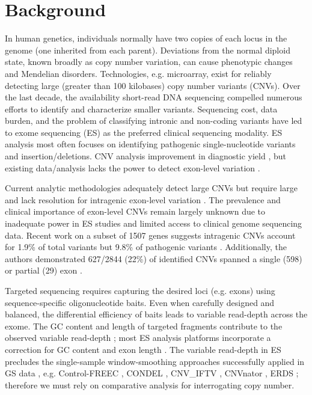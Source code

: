 \documentclass{bmcart}\usepackage[]{graphicx}\usepackage[]{color}
\begin{document}
\section{Background}

In human genetics, individuals normally have two copies of each locus in the genome (one inherited from each parent).
Deviations from the normal diploid state, known broadly as copy number variation, can cause phenotypic changes and Mendelian disorders.
Technologies, e.g. microarray, exist for reliably detecting large (greater than 100 kilobases) copy number variants (CNVs).
Over the last decade, the availability short-read DNA sequencing compelled numerous efforts to identify and characterize smaller variants.
Sequencing cost, data burden, and the problem of classifying intronic and non-coding variants have led to exome sequencing (ES) as the preferred clinical sequencing modality.
ES analysis most often focuses on identifying pathogenic single-nucleotide variants and insertion/deletions.
CNV analysis  improvement in diagnostic yield \cite{marchuk:2018aa}, but existing data/analysis lacks the power to detect exon-level variation \cite{retterer:2015aa,yao:2017aa}.

Current analytic methodologies adequately detect large CNVs but require large  and lack resolution for intragenic exon-level variation \cite{plagnol:2012aa,krumm:2012aa,fromer:2012aa,jiang:2015aa}.
The prevalence and clinical importance of exon-level CNVs remain largely unknown due to inadequate power in ES studies and limited access to clinical genome sequencing data.
Recent work on a subset of 1507 genes suggests intragenic CNVs account for 1.9\% of total variants but 9.8\% of pathogenic variants \cite{truty:2019aa}.
Additionally, the authors demonstrated 627/2844 (22\%) of identified CNVs spanned a single (598) or partial (29) exon \cite{truty:2019aa}.

Targeted sequencing requires capturing the desired loci (e.g. exons) using sequence-specific oligonucleotide baits.
Even when carefully designed and balanced, the differential efficiency of baits leads to variable read-depth across the exome.
The GC content and length of targeted fragments contribute to the observed variable read-depth \cite{benjamini:2012aa}; most ES analysis platforms incorporate a correction for GC content and exon length \cite{kadalayil:2015aa}.
The variable read-depth in ES precludes the single-sample window-smoothing approaches successfully applied in GS data \cite{chiang:2009aa}, e.g. Control-FREEC \cite{boeva:2012aa}, CONDEL \cite{yuan:2020aa}, CNV\_IFTV \cite{yuan:2019aa}, CNVnator \cite{abyzov:2011aa}, ERDS \cite{zhu:2012aa}; therefore we must rely on comparative analysis for interrogating copy number.
\end{document}

